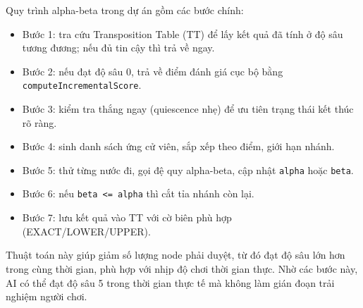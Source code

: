 \setlength{\parindent}{1.5em} Quy trình alpha-beta trong dự án gồm các bước chính:
\begin{itemize}
	\item Bước 1: tra cứu Transposition Table (TT) để lấy kết quả đã tính ở độ sâu tương đương; nếu đủ tin cậy thì trả về ngay.
	\item Bước 2: nếu đạt độ sâu 0, trả về điểm đánh giá cục bộ bằng \texttt{computeIncrementalScore}.
	\item Bước 3: kiểm tra thắng ngay (quiescence nhẹ) để ưu tiên trạng thái kết thúc rõ ràng.
	\item Bước 4: sinh danh sách ứng cử viên, sắp xếp theo điểm, giới hạn nhánh.
	\item Bước 5: thử từng nước đi, gọi đệ quy alpha-beta, cập nhật \texttt{alpha} hoặc \texttt{beta}.
	\item Bước 6: nếu \texttt{beta <= alpha} thì cắt tỉa nhánh còn lại.
	\item Bước 7: lưu kết quả vào TT với cờ biên phù hợp (EXACT/LOWER/UPPER).
\end{itemize}
\setlength{\parindent}{1.5em} Thuật toán này giúp giảm số lượng node phải duyệt, từ đó đạt độ sâu lớn hơn trong cùng thời gian, phù hợp với nhịp độ chơi thời gian thực.
\setlength{\parindent}{1.5em} Nhờ các bước này, AI có thể đạt độ sâu 5 trong thời gian thực tế mà không làm gián đoạn trải nghiệm người chơi.

